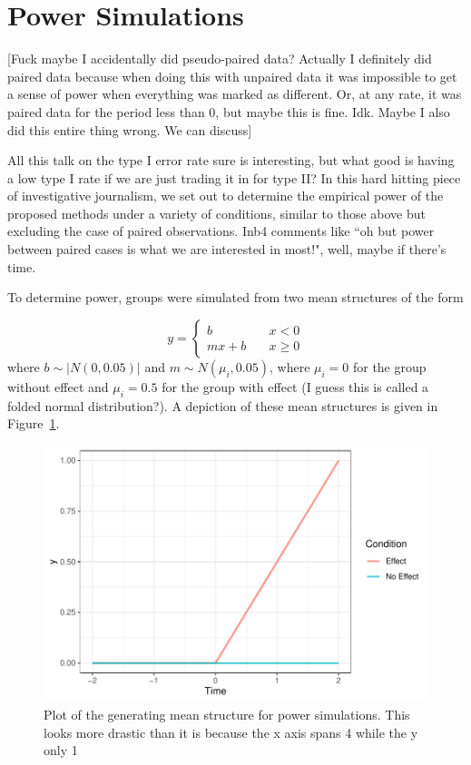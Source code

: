 \documentclass{article}
\begin{document}
\section{Power Simulations}

[Fuck maybe I accidentally did pseudo-paired data? Actually I definitely did paired data because when doing this with unpaired data it was impossible to get a sense of power when everything was marked as different. Or, at any rate, it was paired data for the period less than 0, but maybe this is fine. Idk. Maybe I also did this entire thing wrong. We can discuss]

All this talk on the type I error rate sure is interesting, but what good is having a low type I rate if we are just trading it in for type II? In this hard hitting piece of investigative journalism, we set out to determine the empirical power of the proposed methods under a variety of conditions, similar to those above but excluding the case of paired observations. Inb4 comments like ``oh but power between paired cases is what we are interested in most!", well, maybe if there's time.

To determine power, groups were simulated from two mean structures of the form

\begin{equation}
y = \begin{cases}
b \quad &x < 0 \\
mx + b \quad &x \geq 0
\end{cases}
\end{equation}
where $b \sim |N(0, 0.05)|$ and $m \sim N(\mu_i, 0.05)$, where $\mu_i = 0$ for the group without effect and $\mu_i = 0.5$ for the group with effect (I guess this is called a folded normal distribution?). A depiction of these mean structures is given in Figure~\ref{fig:power_plot}.

\begin{figure}[H]
\centering
\includegraphics{power_plot.pdf}
\caption{Plot of the generating mean structure for power simulations. This looks more drastic than it is because the x axis spans 4 while the y only 1}
\label{fig:power_plot}
\end{figure}
\end{document}
